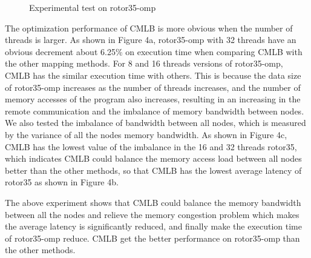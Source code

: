 \documentclass[a4paper,fleqn]{cas-sc}
\begin{document}
\begin{figure}[htbp]
{\begin{minipage}[t]{0.45\linewidth}
		\end{minipage}
	}%
	\centering
	\caption{Experimental test on rotor35-omp} \label{FIG:5}
\end{figure}

The optimization performance of CMLB is more obvious when the number of threads is larger. As shown in Figure 4a, rotor35-omp with 32 threads have an obvious decrement about 6.25\% on execution time when comparing CMLB with the other mapping methods. For 8 and 16 threads versions of rotor35-omp, CMLB has the similar execution time with others. This is because the data size of rotor35-omp increases as the number of threads increases, and the number of memory accesses of the program also increases, resulting in an increasing in the remote communication and the imbalance of memory bandwidth between nodes. We also tested the imbalance of bandwidth between all nodes, which is measured by the variance of all the nodes memory bandwidth. As shown in Figure 4c, CMLB has the lowest value of the imbalance in the 16 and 32 threads rotor35, which indicates CMLB could balance the memory access load between all nodes better than the other methods, so that CMLB has the lowest average latency of rotor35 as shown in Figure 4b.
 
The above experiment shows that CMLB could balance the memory bandwidth between all the nodes and relieve the memory congestion problem which makes the average latency is significantly reduced, and finally make the execution time of rotor35-omp reduce. CMLB get the better performance on rotor35-omp than the other methods. 
\end{document}
